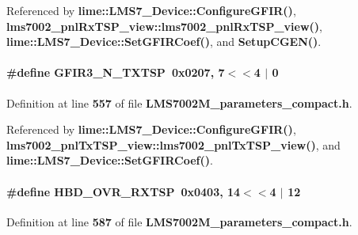 Referenced by {\bf lime\+::\+L\+M\+S7\+\_\+\+Device\+::\+Configure\+G\+F\+I\+R()}, {\bf lms7002\+\_\+pnl\+Rx\+T\+S\+P\+\_\+view\+::lms7002\+\_\+pnl\+Rx\+T\+S\+P\+\_\+view()}, {\bf lime\+::\+L\+M\+S7\+\_\+\+Device\+::\+Set\+G\+F\+I\+R\+Coef()}, and {\bf Setup\+C\+G\+E\+N()}.

\paragraph[{G\+F\+I\+R3\+\_\+\+N\+\_\+\+T\+X\+T\+SP}]{\setlength{\rightskip}{0pt plus 5cm}\#define G\+F\+I\+R3\+\_\+\+N\+\_\+\+T\+X\+T\+SP~0x0207, 7$<$$<$4 $\vert$  0}\label{LMS7002M__parameters__compact_8h_aecbc8b7def7c7f82178a57fff81243fa}


Definition at line {\bf 557} of file {\bf L\+M\+S7002\+M\+\_\+parameters\+\_\+compact.\+h}.



Referenced by {\bf lime\+::\+L\+M\+S7\+\_\+\+Device\+::\+Configure\+G\+F\+I\+R()}, {\bf lms7002\+\_\+pnl\+Tx\+T\+S\+P\+\_\+view\+::lms7002\+\_\+pnl\+Tx\+T\+S\+P\+\_\+view()}, and {\bf lime\+::\+L\+M\+S7\+\_\+\+Device\+::\+Set\+G\+F\+I\+R\+Coef()}.

\paragraph[{H\+B\+D\+\_\+\+O\+V\+R\+\_\+\+R\+X\+T\+SP}]{\setlength{\rightskip}{0pt plus 5cm}\#define H\+B\+D\+\_\+\+O\+V\+R\+\_\+\+R\+X\+T\+SP~0x0403, 14$<$$<$4 $\vert$  12}\label{LMS7002M__parameters__compact_8h_aaa0dd720d2bcf68757d2b7dec3c7fadc}


Definition at line {\bf 587} of file {\bf L\+M\+S7002\+M\+\_\+parameters\+\_\+compact.\+h}.



